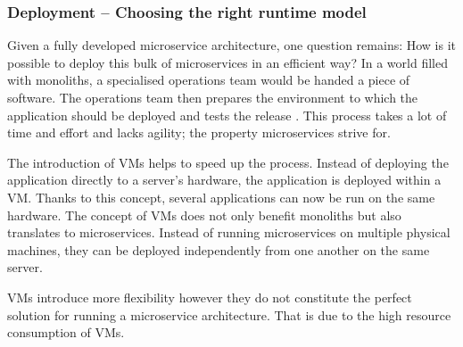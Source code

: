 \subsubsection{Deployment -- Choosing the right runtime model}%
\label{ssub:Deployment_Runtime_Model}

Given a fully developed microservice architecture, one question remains: How is
it possible to deploy this bulk of microservices in an efficient way? In a
world filled with monoliths, a specialised operations team would be handed a
piece of software. The operations team then prepares the environment to which
the application should be deployed and tests the release
\autocite{VillamizarEvaluatingmonolithicmicroservice2015}. This process takes a
lot of time and effort and lacks agility; the property microservices strive
for.

The introduction of \acp{VM} helps to speed up the process. Instead of
deploying the application directly to a server's hardware, the application is
deployed within a \ac{VM}. Thanks to this concept, several applications can now
be run on the same hardware. The concept of \acp{VM} does not only benefit
monoliths but also translates to microservices. Instead of running
microservices on multiple physical machines, they can be deployed
independently from one another on the same server.

\acp{VM} introduce more flexibility however they do not constitute the perfect
solution for running a microservice architecture. That is due to the high
resource consumption of \acp{VM}.

